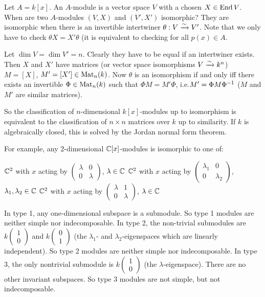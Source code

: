 \begin{exam}
	Let $A=k[x]$.
	An $A$-module is a vector space $V$ with a chosen $X \in \operatorname{End} V$.
	When are two $A$-modules $(V,X)$ and $(V',X')$ isomorphic?
	They are isomorphic when there is an invertible intertwiner $\theta:V \xrightarrow{\sim} V'$.
	Note that we only have to check $\theta X = X'\theta$ (it is equivalent to checking for all $p(x) \in A$.
	
	Let $\dim V = \dim V' = n$.
	Clearly they have to be equal if an intertwiner exists.
	Then $X$ and $X'$ have matrices (or vector space isomorphisms $V \xrightarrow{\sim} k^n$) $M = [X]$, $M'=[X'] \in \operatorname{Mat}_n(k)$.
	Now $\theta$ is an isomorphism if and only iff there exists an invertible $\Phi \in \operatorname{Mat}_n(k)$ such that $\Phi M = M'\Phi$, i.e.\@ $M' = \Phi M \Phi^{-1}$ ($M$ and $M'$ are similar matrices).
	
	So the classification of $n$-dimensional $k[x]$-modules up to isomorphism is equivalent to the classification of $n \times n$ matrices over $k$ up to similarity.
	If $k$ is algebraically closed, this is solved by the Jordan normal form theorem.
	
	For example, any 2-dimensional $\mathbb{C}[x]$-modules is isomorphic to one of:
	\begin{enum}
		\io $\mathbb{C}^2$ with $x$ acting by $
		\left(
		\begin{smallmatrix}
			\lambda & 0 \\
			0 & \lambda
		\end{smallmatrix}
		\right)
		$, $\lambda \in \mathbb{C}$
		\io $\mathbb{C}^2$ with $x$ acting by $
		\left(
		\begin{smallmatrix}
		\lambda_1 & 0 \\
		0 & \lambda_2
		\end{smallmatrix}
		\right)
		$, $\lambda_1,\lambda_2 \in \mathbb{C}$
		\io $\mathbb{C}^2$ with $x$ acting by $
		\left(
		\begin{smallmatrix}
		\lambda & 1 \\
		0 & \lambda
		\end{smallmatrix}
		\right)
		$, $\lambda \in \mathbb{C}$
	\end{enum}
	In type 1, any one-dimensional subspace is a submodule.
	So type 1 modules are neither simple nor indecomposable.
	In type 2, the non-trivial submodules are $k
	\left(
	\begin{smallmatrix}
	1 \\
	0
	\end{smallmatrix}
	\right)
	$
	and
	$k
	\left(
	\begin{smallmatrix}
	0 \\
	1
	\end{smallmatrix}
	\right)
	$ (the $\lambda_1$- and $\lambda_2$-eigenspaces which are linearly independent).
	So type 2 modules are neither simple nor indecomposable.
	In type 3, the only nontrivial submodule is
	$k
	\left(
	\begin{smallmatrix}
	1 \\
	0
	\end{smallmatrix}
	\right)
	$
	(the $\lambda$-eigenspace).
	There are no other invariant subspaces.
	So type 3 modules are not simple, but not indecomposable.
\end{exam}
